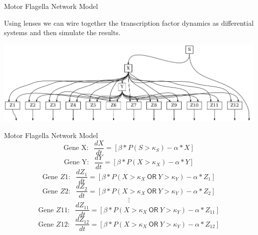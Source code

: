 \documentclass{beamer}
\begin{document}
\begin{frame}{Motor Flagella Network Model}
    \begin{large}
        Using lenses we can wire together the transcription factor dynamics as differential systems and then simulate the results.

    \end{large}

    \begin{center}
        \includegraphics[scale=0.35]{motor_flagella_network.png}
    \end{center}

\end{frame}


\begin{frame}{Motor Flagella Network Model}
    $$\text{Gene X: } \ \ \frac{dX}{dt} = [\beta*P(S > \kappa_S) - \alpha * X]$$
    $$\text{Gene Y: } \ \ \frac{dY}{dt} = [\beta*P(X > \kappa_X) - \alpha * Y]$$
    $$\text{Gene $Z1$: } \ \ \frac{dZ_1}{dt} = [\beta*P(X > \kappa_X \ \mathsf{OR} \ Y > \kappa_Y) - \alpha * Z_1]$$
    $$\text{Gene $Z2$: } \ \ \frac{dZ_2}{dt} = [\beta*P(X > \kappa_X \ \mathsf{OR} \ Y > \kappa_Y) - \alpha * Z_2]$$
    $$\vdots$$
    $$\text{Gene $Z11$: } \ \ \frac{dZ_{11}}{dt} = [\beta*P(X > \kappa_X \ \mathsf{OR} \ Y > \kappa_Y) - \alpha * Z_{11}]$$
    $$\text{Gene $Z12$: } \ \ \frac{dZ_{12}}{dt} = [\beta*P(X > \kappa_X \ \mathsf{OR} \ Y > \kappa_Y) - \alpha * Z_{12}]$$

\end{frame}
\end{document}
